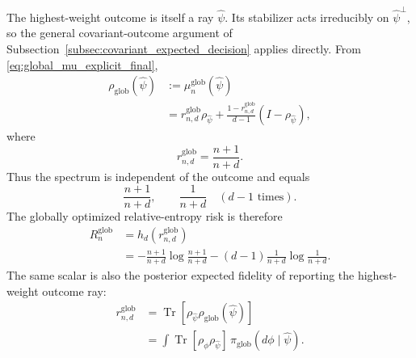 \documentclass[journal]{IEEEtran}
\begin{document}
The highest-weight outcome is itself a ray \(\widehat\psi\).  Its stabilizer
acts irreducibly on \(\widehat\psi^\perp\), so the general covariant-outcome
argument of Subsection~\ref{subsec:covariant_expected_decision} applies
directly.  From \eqref{eq:global_mu_explicit_final},
\begin{equation}
\begin{split}
    \rho_{\mathrm{glob}}(\widehat\psi)
    &:={\mu}_n^{\mathrm{glob}}(\widehat\psi)                                   \\
    &=
    r_{n,d}^{\mathrm{glob}}\rho_{\widehat\psi}
    +
    \frac{1-r_{n,d}^{\mathrm{glob}}}{d-1}
    (I-\rho_{\widehat\psi}),
\end{split}
\label{eq:global_posterior_depolarizing_form}
\end{equation}
where
\begin{equation}
    r_{n,d}^{\mathrm{glob}}
    =
    \frac{n+1}{n+d}.
    \label{eq:r_glob_reported_def_value}
\end{equation}
Thus the spectrum is independent of the outcome and equals
\begin{equation}
    \frac{n+1}{n+d},
    \qquad
    \frac{1}{n+d}
    \quad(d-1\text{ times}).
    \label{eq:global_mu_eigenvalues}
\end{equation}
The globally optimized relative-entropy risk is therefore
\begin{equation}
\begin{split}
    R_n^{\mathrm{glob}}
    &=h_d(r_{n,d}^{\mathrm{glob}})                                               \\
    &=-\frac{n+1}{n+d}\log\frac{n+1}{n+d}
      -(d-1)\frac{1}{n+d}\log\frac{1}{n+d}.
\end{split}
\label{eq:global_optimized_entropy_risk}
\end{equation}
The same scalar is also the posterior expected fidelity of reporting the
highest-weight outcome ray:
\begin{equation}
\begin{split}
    r_{n,d}^{\mathrm{glob}}
    &=
    \operatorname{Tr}\!\left[
       \rho_{\widehat\psi}\rho_{\mathrm{glob}}(\widehat\psi)
    \right]                                                                     \\
    &=
    \int
    \operatorname{Tr}[\rho_\phi\rho_{\widehat\psi}]\,
    \pi_{\mathrm{glob}}(d\phi\mid\widehat\psi).
\end{split}
\label{eq:global_parameter_as_posterior_fidelity}
\end{equation}
\end{document}
